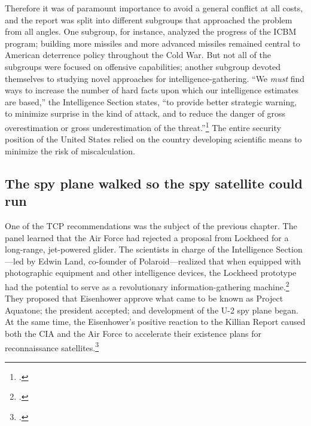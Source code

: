 \documentclass{memoir}
\begin{document}
Therefore it was of paramount importance to avoid a general conflict at all costs, and the report was split into different subgroups that approached the problem from all angles. One subgroup, for instance, analyzed the progress of the ICBM program; building more missiles and more advanced missiles remained central to American deterrence policy throughout the Cold War. But not all of the subgroups were focused on offensive capabilities; another subgroup devoted themselves to studying novel approaches for intelligence-gathering. ``We \emph{must} find ways to increase the number of hard facts upon which our intelligence estimates are based,'' the Intelligence Section states, ``to provide better strategic warning, to minimize surprise in the kind of attack, and to reduce the danger of gross overestimation or gross underestimation of the threat.''\footcite{technological_capabilities_panel_meeting_1955} The entire security position of the United States relied on the country developing scientific means to minimize the risk of miscalculation.

\subsection{The spy plane walked so the spy satellite could run}
One of the TCP recommendations was the subject of the previous chapter. The panel learned that the Air Force had rejected a proposal from Lockheed for a long-range, jet-powered glider. The scientists in charge of the Intelligence Section---led by Edwin Land, co-founder of Polaroid---realized that when equipped with photographic equipment and other intelligence devices, the Lockheed prototype had the potential to serve as a revolutionary information-gathering machine.\footcite[p.~81-82]{killian_sputnik_1977} They proposed that Eisenhower approve what came to be known as Project Aquatone; the president accepted; and development of the U-2 spy plane began. At the same time, the Eisenhower's positive reaction to the Killian Report caused both the CIA and the Air Force to accelerate their existence plans for reconnaissance satellites.\footcite[p.~83]{killian_sputnik_1977}
\end{document}
